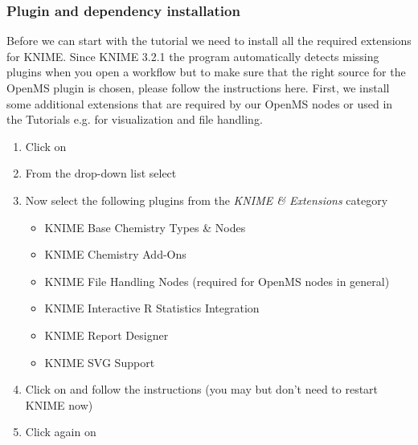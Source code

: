 \subsubsection{Plugin and dependency installation}
\label{Install_plugins}
Before we can start with the tutorial we need to install all the required extensions for KNIME. Since KNIME 3.2.1 the program automatically
detects missing plugins when you open a workflow but to make sure that the right source for the OpenMS plugin is chosen, please follow the instructions here.
First, we install some additional extensions that are required by our OpenMS nodes or used in the Tutorials e.g. for visualization and file handling.
\begin{enumerate}
\item Click on 
\item From the  drop-down list select \menu{\KnimeUpdateSite}
\item Now select the following plugins from the \textit{KNIME \& Extensions} category
    \begin{itemize}
    \item KNIME Base Chemistry Types \& Nodes
    \item KNIME Chemistry Add-Ons
    \item KNIME File Handling Nodes (required for OpenMS nodes in general)
    \item KNIME Interactive R Statistics Integration
    \item KNIME Report Designer
    \item KNIME SVG Support
    \end{itemize}
\item Click on  and follow the instructions (you may but don't need to restart KNIME now)
\item Click again on 

\end{enumerate}
